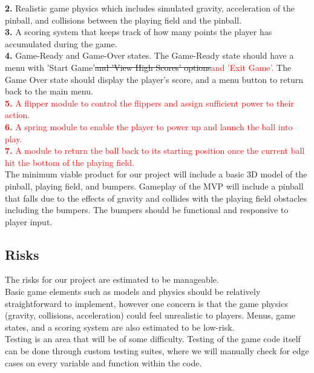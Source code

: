 \documentclass{article}
\begin{document}
\textbf{2.} Realistic game physics which includes simulated gravity, acceleration of the pinball, and collisions between the playing field and the pinball. \\

\textbf{3.} A scoring system that keeps track of how many points the player has accumulated during the game. \\

\textbf{4.} Game-Ready and Game-Over states. The Game-Ready state should have a menu with 'Start Game'\st{and 'View High Scores' options}\textcolor{red}{and 'Exit Game'.} The Game Over state should display the player's score, and a menu button to return back to the main menu. \\

\textcolor{red}{\textbf{5.} A flipper module to control the flippers and assign sufficient power to their action.}\\

\textcolor{red}{\textbf{6.} A spring module to enable the player to power up and launch the ball into play.}\\

\textcolor{red}{\textbf{7.} A module to return the ball back to its starting position once the current ball hit the bottom of the playing field.}\\


The minimum viable product for our project will include a basic 3D model of the pinball, playing field, and bumpers. Gameplay of the MVP will include a pinball that falls due to the effects of gravity and collides with the playing field obstacles including the bumpers. The bumpers should be functional and responsive to player input. 

\subsection{Risks}

The risks for our project are estimated to be manageable. \\

Basic game elements such as models and physics should be relatively straightforward to implement, however one concern is that the game physics (gravity, collisions, acceleration) could feel unrealistic to players. Menus, game states, and a scoring system are also estimated to be low-risk.\\

Testing is an area that will be of some difficulty. Testing of the game code itself can be done through custom testing suites, where we will manually check for edge cases on every variable and function within the code. 
\end{document}

